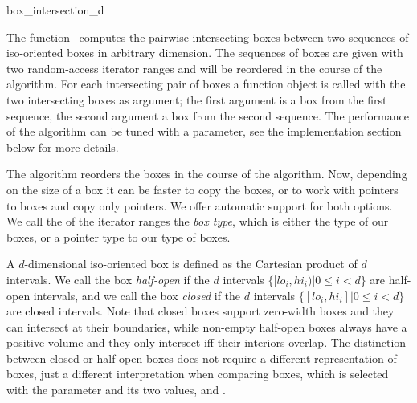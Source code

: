 

\begin{ccRefFunction}{box_intersection_d}

\ccDefinition

The function \ccRefName\ computes the pairwise intersecting boxes
between two sequences of iso-oriented boxes in arbitrary dimension.
The sequences of boxes are given with two random-access iterator
ranges and will be reordered in the course of the algorithm. For each
intersecting pair of boxes a  function object is called
with the two intersecting boxes as argument; the first argument is a
box from the first sequence, the second argument a box from the second
sequence.  The performance of the algorithm can be tuned with a
 parameter, see the implementation section below for more
details.

The algorithm reorders the boxes in the course of the algorithm. Now,
depending on the size of a box it can be faster to copy the boxes, or
to work with pointers to boxes and copy only pointers. We offer
automatic support for both options. We call the  of
the iterator ranges the \emph{box type}, which is either the type of
our boxes, or a pointer type to our type of boxes.

A $d$-dimensional iso-oriented box is defined as the Cartesian product
of $d$ intervals. We call the box \emph{half-open} if the $d$
intervals $\{ [lo_i,hi_i) | 0 \leq i < d\}$ are half-open intervals,
and we call the box \emph{closed} if the $d$ intervals $\{ [lo_i,hi_i]
| 0 \leq i < d\}$ are closed intervals. Note that closed boxes support
zero-width boxes and they can intersect at their boundaries, while
non-empty half-open boxes always have a positive volume and they only
intersect iff their interiors overlap.  The distinction between closed
or half-open boxes does not require a different representation of
boxes, just a different interpretation when comparing boxes, which is
selected with the  parameter and its two values,
 and
.


\end{ccRefFunction}
